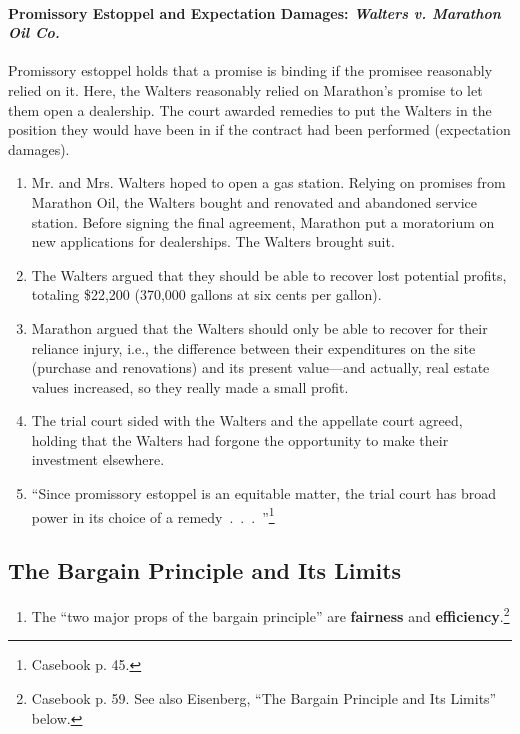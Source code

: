 \paragraph{Promissory Estoppel and Expectation Damages: \emph{Walters v. 
Marathon Oil Co.}}

Promissory estoppel holds that a promise is binding if the promisee reasonably 
relied on it. Here, the Walters reasonably relied on Marathon's promise to let 
them open a dealership. The court awarded remedies to put the Walters in the 
position they would have been in if the contract had been performed 
(expectation damages).

\begin{enumerate}
    \item Mr. and Mrs. Walters hoped to open a gas station. Relying on 
    promises from Marathon Oil, the Walters bought and renovated and abandoned 
    service station. Before signing the final agreement, Marathon put a 
    moratorium on new applications for dealerships. The Walters brought suit.
    \item The Walters argued that they should be able to recover lost 
    potential profits, totaling \$22,200 (370,000 gallons at six cents per 
    gallon).
    \item Marathon argued that the Walters should only be able to recover for 
    their reliance injury, i.e., the difference between their expenditures on 
    the site (purchase and renovations) and its present value---and actually, 
    real estate values increased, so they really made a small profit.
    \item The trial court sided with the Walters and the appellate court 
    agreed, holding that the Walters had forgone the opportunity to make their 
    investment elsewhere.
    \item ``Since promissory estoppel is an equitable matter, the trial court 
    has broad power in its choice of a remedy~.~.~.~''\footnote{Casebook p. 
    45.}
\end{enumerate}

\subsection{The Bargain Principle and Its Limits} 

\begin{enumerate}
    \item The ``two major props of the bargain principle'' are 
    \textbf{fairness} and \textbf{efficiency}.\footnote{Casebook p. 59. See 
    also Eisenberg, ``The Bargain Principle and Its Limits'' below.}
\end{enumerate}

